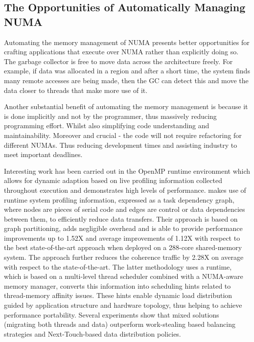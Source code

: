 \documentclass{paper}\usepackage{graphicx}
\begin{document}
\subsection{The Opportunities of Automatically Managing NUMA}
\label{sec:managed_numa}

Automating the memory management of NUMA presents better opportunities for crafting applications that execute over NUMA rather than explicitly doing so. The garbage collector is free to move data across the architecture freely. For example, if data was allocated in a region and after a short time, the system finds many remote accesses are being made, then the GC can detect this and move the data closer to threads that make more use of it.

Another substantial benefit of automating the memory management is because it is done implicitly and not by the programmer, thus massively reducing programming effort. Whilst also simplifying code understanding and maintainability. Moreover and crucial - the code will not require refactoring for different NUMAs. Thus reducing development times and assisting industry to meet important deadlines.

Interesting work has been carried out in the OpenMP runtime environment which allows for dynamic adaption based on live profiling information collected throughout execution\cite{DBLP:journals/ijpp/BroquedisFGWN10,DBLP:conf/ics/BarreraMALVC18} and demonstrates high levels of performance. \cite{DBLP:journals/ijpp/BroquedisFGWN10} makes use of runtime system profiling information, expressed as a task dependency graph, where nodes are pieces of serial code and edges are control or data dependencies between them, to efficiently reduce data transfers. Their approach is based on graph partitioning, adds negligible overhead and is able to provide performance improvements up to 1.52X and average improvements of 1.12X with respect to the best state-of-the-art approach when deployed on a 288-core shared-memory system. The approach further reduces the coherence traffic by 2.28X on average with respect to the state-of-the-art. The latter methodology \cite{DBLP:conf/ics/BarreraMALVC18} uses a runtime, which is based on a multi-level thread scheduler combined with a NUMA-aware memory manager, converts this information into scheduling hints related to thread-memory affinity issues. These hints enable dynamic load distribution guided by application structure and hardware topology, thus helping to achieve performance portability. Several experiments show that mixed solutions (migrating both threads and data) outperform work-stealing based balancing strategies and Next-Touch-based data distribution policies.
\end{document}

